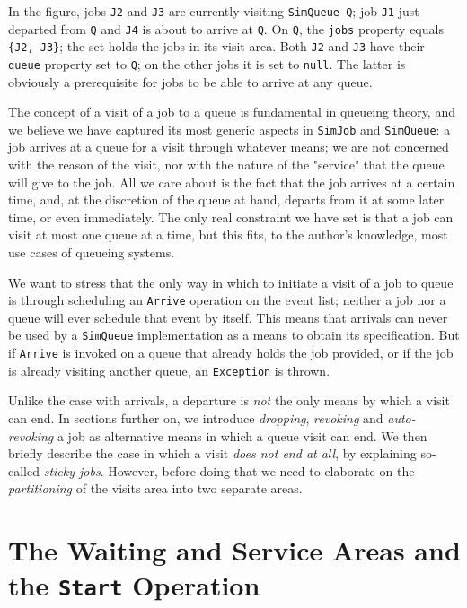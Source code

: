 In the figure,
  jobs \lstinline|J2| and \lstinline|J3|
  are currently visiting \lstinline|SimQueue Q|;
  job \lstinline|J1| just departed from \lstinline|Q| and
  \lstinline|J4| is about to arrive at \lstinline|Q|.
On \lstinline|Q|,
  the \lstinline|jobs| property equals \lstinline|{J2, J3}|;
  the set holds the jobs in its visit area.
Both \lstinline|J2| and \lstinline|J3| have their
  \lstinline|queue| property set to
  \lstinline|Q|;
  on the other jobs it is set to
  \lstinline|null|.
The latter is obviously a prerequisite for jobs to
  be able to arrive at any queue.

The concept of a visit of a job to a queue is
  fundamental in queueing theory,
  and we believe we have captured its most generic
  aspects in \lstinline|SimJob| and \lstinline|SimQueue|:
  a job arrives at a queue for a visit through
  whatever means; we are not concerned with the
  reason of the visit, nor with the nature of
  the "service" that the queue will give to the job.
All we care about is the fact that the job arrives at
  a certain time, and, at the discretion of the queue at hand,
  departs from it at some later time, or even immediately.
The only real constraint we have set is that a job
  can visit at most one queue at a time,
  but this fits, to the author's knowledge,
  most use cases of queueing systems.
  
We want to stress that the only way in which
  to initiate a visit of a job to queue
  is through scheduling an \lstinline|Arrive|
  operation on the event list;
  neither a job nor a queue will
  ever schedule that event by itself.
This means that arrivals can never
  be used by a \lstinline|SimQueue|
  implementation as a means
  to obtain its specification.  
But if \lstinline|Arrive| is invoked
  on a queue that already holds the job provided,
  or if the job is already visiting another queue,
  an \lstinline|Exception| is thrown.
  
Unlike the case with arrivals,
  a departure is {\em not\/} the only
  means by which a visit can end.
In sections further on,
  we introduce {\em dropping},
  {\em revoking\/}
  and {\em auto-revoking}
  a job as alternative means in
  which a queue visit can end.
We then briefly describe
  the case in which
  a visit {\em does not end at all},
  by explaining so-called {\em sticky jobs}.
However,
  before doing that we need to elaborate
  on the {\em partitioning\/}
  of the visits area
  into two separate areas.

\section{The Waiting and Service Areas
         and the \texttt{\bf Start} Operation}
\label{sec:guided:wait-serv-area}

